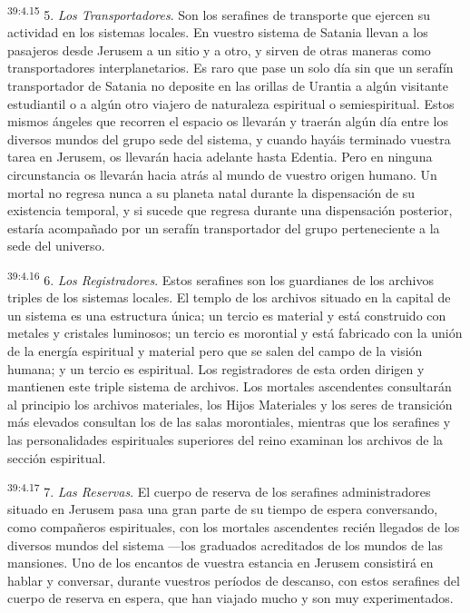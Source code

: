 \par
\textsuperscript{39:4.15} 5. \textit{Los Transportadores}. Son los serafines de transporte que ejercen su actividad en los sistemas locales. En vuestro sistema de Satania llevan a los pasajeros desde Jerusem a un sitio y a otro, y sirven de otras maneras como transportadores interplanetarios. Es raro que pase un solo día sin que un serafín transportador de Satania no deposite en las orillas de Urantia a algún visitante estudiantil o a algún otro viajero de naturaleza espiritual o semiespiritual. Estos mismos ángeles que recorren el espacio os llevarán y traerán algún día entre los diversos mundos del grupo sede del sistema, y cuando hayáis terminado vuestra tarea en Jerusem, os llevarán hacia adelante hasta Edentia. Pero en ninguna circunstancia os llevarán hacia atrás al mundo de vuestro origen humano. Un mortal no regresa nunca a su planeta natal durante la dispensación de su existencia temporal, y si sucede que regresa durante una dispensación posterior, estaría acompañado por un serafín transportador del grupo perteneciente a la sede del universo.

\par
\textsuperscript{39:4.16} 6. \textit{Los Registradores}. Estos serafines son los guardianes de los archivos triples de los sistemas locales. El templo de los archivos situado en la capital de un sistema es una estructura única; un tercio es material y está construido con metales y cristales luminosos; un tercio es morontial y está fabricado con la unión de la energía espiritual y material pero que se salen del campo de la visión humana; y un tercio es espiritual. Los registradores de esta orden dirigen y mantienen este triple sistema de archivos. Los mortales ascendentes consultarán al principio los archivos materiales, los Hijos Materiales y los seres de transición más elevados consultan los de las salas morontiales, mientras que los serafines y las personalidades espirituales superiores del reino examinan los archivos de la sección espiritual.

\par
\textsuperscript{39:4.17} 7. \textit{Las Reservas}. El cuerpo de reserva de los serafines administradores situado en Jerusem pasa una gran parte de su tiempo de espera conversando, como compañeros espirituales, con los mortales ascendentes recién llegados de los diversos mundos del sistema ---los graduados acreditados de los mundos de las mansiones. Uno de los encantos de vuestra estancia en Jerusem consistirá en hablar y conversar, durante vuestros períodos de descanso, con estos serafines del cuerpo de reserva en espera, que han viajado mucho y son muy experimentados.

